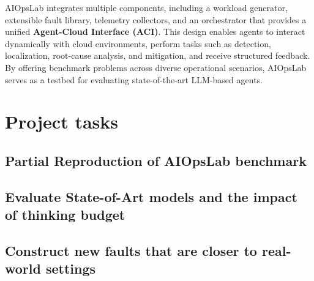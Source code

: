 \documentclass[conference]{IEEEtran}
\begin{document}
AIOpsLab integrates multiple components, including a workload generator, extensible fault library, telemetry collectors, and an orchestrator that provides a unified \textbf{Agent-Cloud Interface (ACI)}. This design enables agents to interact dynamically with cloud environments, perform tasks such as detection, localization, root-cause analysis, and mitigation, and receive structured feedback. By offering benchmark problems across diverse operational scenarios, AIOpsLab serves as a testbed for evaluating state-of-the-art LLM-based agents.

\section{Project tasks}

\subsection{Partial Reproduction of AIOpsLab benchmark}
\subsection{Evaluate State-of-Art models and the impact of thinking budget}
\subsection{Construct new faults that are closer to real-world settings}









\vspace{12pt}
\end{document}

